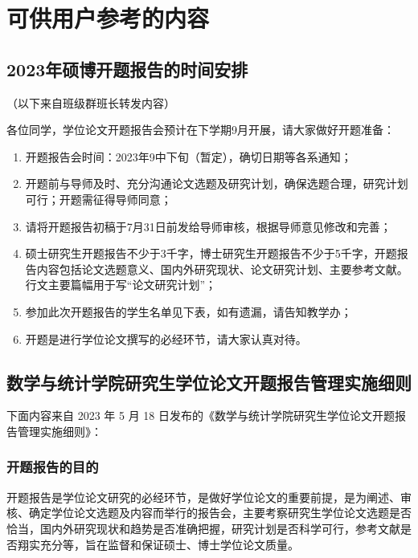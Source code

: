
\section{可供用户参考的内容}

\subsection{2023年硕博开题报告的时间安排}

（以下来自班级群班长转发内容\cite{2024届硕博开题报告QQ通知}）

各位同学，学位论文开题报告会预计在下学期9月开展，请大家做好开题准备：
\begin{enumerate}
  \item 开题报告会时间：2023年9中下旬（暂定），确切日期等各系通知；
  \item 开题前与导师及时、充分沟通论文选题及研究计划，确保选题合理，研究计划可行；开题需征得导师同意；
  \item 请将开题报告初稿于7月31日前发给导师审核，根据导师意见修改和完善；
  \item 硕士研究生开题报告不少于3千字，博士研究生开题报告不少于5千字，开题报告内容包括论文选题意义、国内外研究现状、论文研究计划、主要参考文献。行文主要篇幅用于写“论文研究计划”；
  \item 参加此次开题报告的学生名单见下表，如有遗漏，请告知教学办；
  \item 开题是进行学位论文撰写的必经环节，请大家认真对待。
\end{enumerate}


\subsection{数学与统计学院研究生学位论文开题报告管理实施细则}

下面内容来自 2023 年 5 月 18 日发布的《数学与统计学院研究生学位论文开题报告管理实施细则》\cite{数学与统计学院研究生学位论文开题报告管理实施细则}：

\subsubsection{开题报告的目的}

开题报告是学位论文研究的必经环节，是做好学位论文的重要前提，是为阐述、审核、确定学位论文选题及内容而举行的报告会，主要考察研究生学位论文选题是否恰当，国内外研究现状和趋势是否准确把握，研究计划是否科学可行，参考文献是否翔实充分等，旨在监督和保证硕士、博士学位论文质量。


